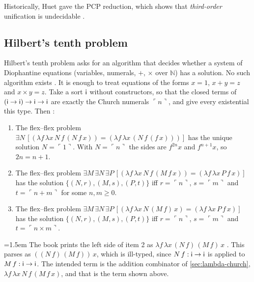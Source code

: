 {Historically, Huet \cite{Huet1973} gave the PCP reduction, which shows that \emph{third-order}
unification is undecidable .

\subsection{Hilbert's tenth problem}\label{sec:lambda-hilbert}

Hilbert's tenth problem asks for an algorithm that decides whether a system of Diophantine equations
(variables, numerals, $+$, $\times$ over $\mathbb N$) has a solution. No such algorithm exists
. It is enough to treat equations of the forms $x=1$, $x+y=z$ and $x\times y=z$. Take a sort
$\mathsf{i}$ without constructors, so that the closed terms of $(\mathsf{i}\to\mathsf{i})\to\mathsf{i}\to\mathsf{i}$ are
exactly the Church numerals $\ulcorner n\urcorner$, and give every existential this type. Then
:
\begin{enumerate}
\item The flex–flex problem $\exists N\,[(\lambda f\,\lambda x\,N\,f\,(N\,f\,x))=(\lambda f\,\lambda x\,(N\,f\,(f\,x)))]$
      has the unique solution $N=\ulcorner 1\urcorner$. With $N=\ulcorner n\urcorner$ the sides are
      $f^{2n}x$ and $f^{n+1}x$, so $2n=n+1$.
\item The flex–flex problem $\exists M\,\exists N\,\exists P\,[(\lambda f\,\lambda x\,N\,f\,(M\,f\,x))=(\lambda f\,\lambda x\,P\,f\,x)]$
      has the solution $\{(N,r),(M,s),(P,t)\}$ iff $r=\ulcorner n\urcorner$, $s=\ulcorner m\urcorner$ and
      $t=\ulcorner n+m\urcorner$ for some $n,m\ge 0$.
\item The flex–flex problem $\exists M\,\exists N\,\exists P\,[(\lambda f\,\lambda x\,N\,(M\,f)\,x)=(\lambda f\,\lambda x\,P\,f\,x)]$
      has the solution $\{(N,r),(M,s),(P,t)\}$ iff $r=\ulcorner n\urcorner$, $s=\ulcorner m\urcorner$ and
      $t=\ulcorner n\times m\urcorner$.
\end{enumerate}

\begin{remark}\emergencystretch=1.5em
The book prints the left side of item 2 as $\lambda f\,\lambda x\,(N\,f)\,(M\,f)\,x$ . This parses
as $((N\,f)\,(M\,f))\,x$, which is ill-typed, since $N\,f:\mathsf{i}\to\mathsf{i}$ is applied to
$M\,f:\mathsf{i}\to\mathsf{i}$. The intended term is the addition combinator of \cref{sec:lambda-church},
$\lambda f\,\lambda x\,N\,f\,(M\,f\,x)$, and that is the term shown above.
\end{remark}

}
